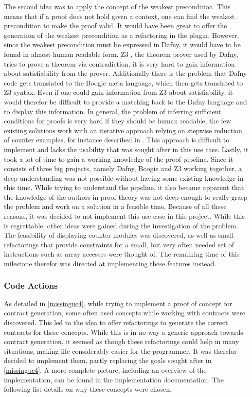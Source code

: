 The second idea was to apply the concept of the weakest precondition. This means that if a proof does not hold given a context, one can find the weakest precondition to make the proof valid. It would have been great to offer the generation of the weakest precondition as a refactoring in the plugin. However, since the weakest precondition must be expressed in Dafny, it would have to be found in almost human readable form. Z3 \cite{z3}, the theorem prover used by Dafny, tries to prove a theorem via contradiction, it is very hard to gain information about satisfiability from the prover. Additionally there is the problem that Dafny code gets translated to the Boogie\cite{boogie} meta language, which then gets translated to Z3 syntax. Even if one could gain information from Z3 about satisfiability, it would therefor be difficult to provide a matching back to the Dafny language and to display this information. In general, the problem of inferring sufficient conditions for proofs is very hard if they should be human readable, the few existing solutions work with an iterative approach relying on stepwise reduction of counter examples, for instance described in \cite{preInference}. This approach is difficult to implement and lacks the usability that was sought after in this use case.\newline
Lastly, it took a lot of time to gain a working knowledge of the proof pipeline. Since it consists of three big projects, namely Dafny, Boogie \cite{boogie} and Z3 working together, a deep understanding was not possible without having some existing knowledge in this time. While trying to understand the pipeline, it also became apparent that the knowledge of the authors in proof theory was not deep enough to really grasp the problem and work on a solution in a feasible time. \newline
Because of all these reasons, it was decided to not implement this use case in this project. While this is regrettable, other ideas were gained during the investigation of the problem. The feasibility of displaying counter modules was discovered, as well as small refactorings that provide constraints for a small, but very often needed set of instructions such as array accesses were thought of. The remaining time of this milestone therefor was directed at implementing these features instead. 
\subsubsection{Code Actions}\label{addCodeActions}
As detailed in \ref{missinguc4}, while trying to implement a proof of concept for contract generation, some often used concepts while working with contracts were discovered. This led to the idea to offer refactorings to generate the correct contracts for these concepts. While this is in no way a generic approach towards contract generation, it seemed as though these refactorings could help in many situations, making life considerably easier for the programmer. It was therefor decided to implement them, partly replacing the goals sought after in \ref{missinguc4}. A more complete picture, including an overview of the implementation, can be found in the implementation documentation. The following list details on why these concepts were chosen.
